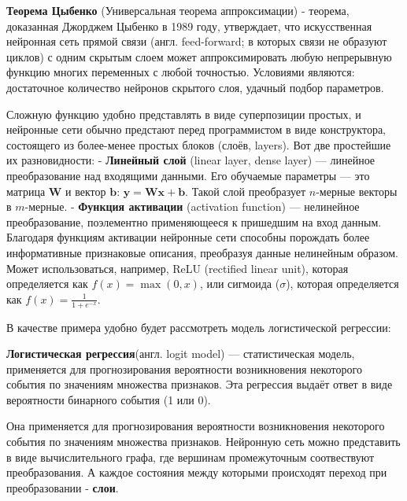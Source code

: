 \vspace{0.25cm}

\textbf{Теорема Цыбенко} (Универсальная теорема аппроксимации) - теорема, доказанная Джорджем Цыбенко в 1989 году, утверждает, что искусственная нейронная сеть прямой связи (англ. feed-forward; в которых связи не образуют циклов) с одним скрытым слоем может аппроксимировать любую непрерывную функцию многих переменных с любой точностью. Условиями являются: достаточное количество нейронов скрытого слоя, удачный подбор параметров.
\vspace{0.25cm}

Сложную функцию удобно представлять в виде суперпозиции простых, и нейронные сети обычно предстают перед программистом в виде конструктора, состоящего из более-менее простых блоков (слоёв, layers). Вот две простейшие их разновидности:
\vspace{0.25cm}
- \textbf{Линейный слой} (linear layer, dense layer) — линейное преобразование над входящими данными. Его обучаемые параметры — это матрица \( \mathbf{W} \) и вектор \( \mathbf{b} \): \( \mathbf{y} = \mathbf{Wx} + \mathbf{b} \). Такой слой преобразует \( n \)-мерные векторы в \( m \)-мерные.
\vspace{0.25cm}
- \textbf{Функция активации} (activation function) — нелинейное преобразование, поэлементно применяющееся к пришедшим на вход данным. Благодаря функциям активации нейронные сети способны порождать более информативные признаковые описания, преобразуя данные нелинейным образом. Может использоваться, например, ReLU (rectified linear unit), которая определяется как \( f(x) = \max(0, x) \), или сигмоида (\( \sigma \)), которая определяется как \( f(x) = \frac{1}{1 + e^{-x}} \). 

\vspace{0.25cm}
В качестве примера удобно будет рассмотреть модель логистической регрессии:

\vspace{0.25cm}
\textbf{Логистическая регрессия}(англ. logit model) — статистическая модель, применяется для прогнозирования вероятности возникновения некоторого события по значениям множества признаков. Эта регрессия выдаёт ответ в виде вероятности бинарного события (1 или 0).

Она применяется для прогнозирования вероятности возникновения некоторого события по значениям множества признаков. Нейронную сеть можно представить в виде вычислительного графа, где вершинам промежуточным соотвествуют преобразования. А каждое состояния между которыми происходят переход при преобразовании - \textbf {слои}. 


